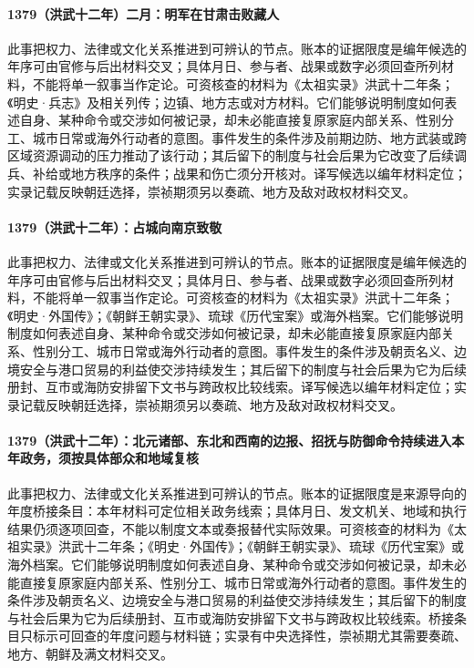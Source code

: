 \paragraph{1379（洪武十二年）二月：明军在甘肃击败藏人} 此事把权力、法律或文化关系推进到可辨认的节点。账本的证据限度是编年候选的年序可由官修与后出材料交叉；具体月日、参与者、战果或数字必须回查所列材料，不能将单一叙事当作定论。可资核查的材料为《太祖实录》洪武十二年条；《明史·兵志》及相关列传；边镇、地方志或对方材料。它们能够说明制度如何表述自身、某种命令或交涉如何被记录，却未必能直接复原家庭内部关系、性别分工、城市日常或海外行动者的意图。事件发生的条件涉及前期边防、地方武装或跨区域资源调动的压力推动了该行动；其后留下的制度与社会后果为它改变了后续调兵、补给或地方秩序的条件；战果和伤亡须分开核对。译写候选以编年材料定位；实录记载反映朝廷选择，崇祯期须另以奏疏、地方及敌对政权材料交叉。

\paragraph{1379（洪武十二年）：占城向南京致敬} 此事把权力、法律或文化关系推进到可辨认的节点。账本的证据限度是编年候选的年序可由官修与后出材料交叉；具体月日、参与者、战果或数字必须回查所列材料，不能将单一叙事当作定论。可资核查的材料为《太祖实录》洪武十二年条；《明史·外国传》；《朝鲜王朝实录》、琉球《历代宝案》或海外档案。它们能够说明制度如何表述自身、某种命令或交涉如何被记录，却未必能直接复原家庭内部关系、性别分工、城市日常或海外行动者的意图。事件发生的条件涉及朝贡名义、边境安全与港口贸易的利益使交涉持续发生；其后留下的制度与社会后果为它为后续册封、互市或海防安排留下文书与跨政权比较线索。译写候选以编年材料定位；实录记载反映朝廷选择，崇祯期须另以奏疏、地方及敌对政权材料交叉。

\paragraph{1379（洪武十二年）：北元诸部、东北和西南的边报、招抚与防御命令持续进入本年政务，须按具体部众和地域复核} 此事把权力、法律或文化关系推进到可辨认的节点。账本的证据限度是来源导向的年度桥接条目：本年材料可定位相关政务线索；具体月日、发文机关、地域和执行结果仍须逐项回查，不能以制度文本或奏报替代实际效果。可资核查的材料为《太祖实录》洪武十二年条；《明史·外国传》；《朝鲜王朝实录》、琉球《历代宝案》或海外档案。它们能够说明制度如何表述自身、某种命令或交涉如何被记录，却未必能直接复原家庭内部关系、性别分工、城市日常或海外行动者的意图。事件发生的条件涉及朝贡名义、边境安全与港口贸易的利益使交涉持续发生；其后留下的制度与社会后果为它为后续册封、互市或海防安排留下文书与跨政权比较线索。桥接条目只标示可回查的年度问题与材料链；实录有中央选择性，崇祯期尤其需要奏疏、地方、朝鲜及满文材料交叉。

